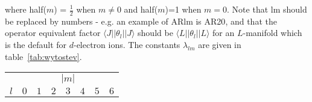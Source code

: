 \noindent where half($m$) = $\frac{1}{2}$ when $m\neq 0$ and half($m$)=1 when $m=0$.
Note that {\prg lm} should be replaced by numbers - e.g. an example of ARlm is {\prg AR20}, and that
the operator equivalent factor $\langle J || \theta_l || J \rangle$ should be $\langle L || \theta_l || L
\rangle$ for an $L$-manifold which is the default for $d$-electron ions. The constants $\lambda_{lm}$
are given in table~\ref{tab:wytostev}.

\begin{table}[h] \renewcommand{\arraystretch}{1.3}
  \begin{center}
    \begin{tabular}{c|ccccccc}
          & \multicolumn{7}{|c}{$|m|$} \\  \cline{2-8}
      $l$ & $0$ & $1$ & $2$ & $3$ & $4$ & $5$ & $6$ \\

\end{tabular}
\end{center}
\end{table}
